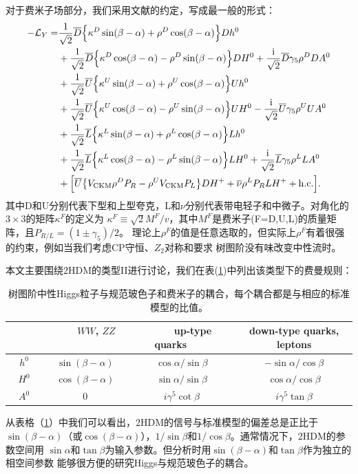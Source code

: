 对于费米子场部分，我们采用文献\cite{cpc:2hdmc}的约定，写成最一般的形式：
\begin{equation}
  \begin{aligned}
    -\mathcal{L}_{Y}=&\frac{1}{\sqrt{2}}\overline{D}\Bigl\{\kappa^D \sin(\beta-\alpha) + 
  \rho^D\cos(\beta-\alpha) \Bigr\}Dh^0
\\
& +\frac{1}{\sqrt{2}}\overline{D}\Bigl\{\kappa^D\cos(\beta-\alpha)-\rho^D\sin(\beta-\alpha) \Bigr\}DH^0
  + \frac{\mathrm{i}}{\sqrt{2}}\overline{D}\gamma_5\rho^D DA^0 \\
&  +\frac{1}{\sqrt{2}}\overline{U}\Bigl\{\kappa^U\sin(\beta-\alpha)+\rho^U\cos(\beta-\alpha) \Bigr\}Uh^0
\\
&  +\frac{1}{\sqrt{2}}\overline{U}\Bigl\{\kappa^U\cos(\beta-\alpha)-\rho^U\sin(\beta-\alpha) \Bigr\}UH^0- 
 \frac{\mathrm{i}}{\sqrt{2}}\overline{U}\gamma_5\rho^U UA^0 \\
&  +\frac{1}{\sqrt{2}}\overline{L}\Bigl\{\kappa^L\sin(\beta-\alpha)+\rho^L\cos(\beta-\alpha) \Bigr\}Lh^0
\\
&  +\frac{1}{\sqrt{2}}\overline{L}\Bigl\{\kappa^L\cos(\beta-\alpha)-\rho^L\sin(\beta-\alpha) \Bigr\}LH^0+ 
 \frac{\mathrm{i}}{\sqrt{2}}\overline{L}\gamma_5\rho^L LA^0 \\
&+\Bigl[\overline{U}\bigl\{V_{\rm{CKM}}\rho^D P_R-\rho^U V_{\rm{CKM}} P_L\bigr\}DH^+ + 
\overline{\nu}\rho^L P_RL H^+ + \rm{h.c.}\Bigr].  
\end{aligned}
\label{eq:2hdmYukawa}
\end{equation}
其中D和U分别代表下型和上型夸克，L和$\nu$分别代表带电轻子和中微子。对角化的$3\times 3$的矩阵$\kappa^F$的定义为
$\kappa^F \equiv \sqrt{2} M^F/v$，其中$M^F$是费米子(F=D,U,L)的质量矩阵，且$P_{R/L} = (1\pm \gamma_5)/2$。
理论上$\rho^F$的值是任意选取的，但实际上$\rho^F$有着很强的约束，例如当我们考虑CP守恒、$Z_2$对称和要求
树图阶没有味改变中性流时。

本文主要围绕2HDM的类型II进行讨论，我们在表(\ref{tab:2HDMcoupling})中列出该类型下的费曼规则：
\begin{table}
  \centering
  \begin{tabular}{c|c|c|c}
    \hline\hline
     ~~~~~ & ~~~~$WW$, $ZZ$~~~~ & ~~~~up-type quarks~~~~ & down-type quarks, leptons \\
    \hline
    $h^0$ & $\sin(\beta-\alpha)$ & $\cos\alpha/\sin\beta$ & $-\sin\alpha/\cos\beta$ \\
    $H^0$ & $\cos(\beta-\alpha)$ & $\sin\alpha/\sin\beta$ &  $\cos\alpha/\cos\beta$ \\
    $A^0$ &                  $0$ & $i\gamma^5\cot\beta$   &  $i\gamma^5\tan\beta$ \\
    \hline\hline
  \end{tabular}
  \caption{
  树图阶中性Higgs粒子与规范玻色子和费米子的耦合，每个耦合都是与相应的标准模型的比值。
   }
\label{tab:2HDMcoupling}
\end{table}
从表格（\ref{tab:2HDMcoupling}）中我们可以看出，2HDM的信号与标准模型的偏差总是正比于
$\sin(\beta-\alpha)$（或$\cos(\beta-\alpha)$），$1/\sin\beta$和$1/\cos\beta$。通常情况下，2HDM的参数空间用
$\sin\alpha$和$\tan\beta$为输入参数。但分析时用$\sin(\beta-\alpha)$和$\tan\beta$作为独立的相空间参数
能够很方便的研究Higgs与规范玻色子的耦合。

